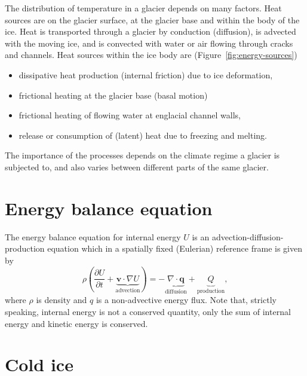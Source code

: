 \documentclass[parskip=half]{scrartcl}
\newcommand{\bq}{\mathbf{q}}
\newcommand{\bv}{\mathbf{v}}
\newcommand{\ddt}[1]{\ensuremath{\frac{\partial #1}{\partial t}}}
\newcommand{\Div}{\nabla\cdot}
\newcommand{\grad}{\nabla}
\begin{document}
The distribution of temperature in a glacier depends on many factors.
Heat sources are on the glacier surface, at the glacier base and
within the body of the ice.  Heat is transported through a glacier by
conduction (diffusion), is advected with the moving ice, and is
convected with water or air flowing through cracks and channels.  Heat
sources within the ice body are (Figure~\ref{fig:energy-sources})
%
\begin{itemize}\itemsep0ex
\item dissipative heat production (internal friction) due to ice
deformation,
\item frictional heating at the glacier base (basal motion)
\item frictional heating of flowing water at englacial channel walls,
\item release or consumption of (latent) heat due to freezing and
melting.
\end{itemize}
%
The importance of the processes depends on the climate regime a
glacier is subjected to, and also varies between different parts of
the same glacier.


\section{Energy balance equation}
\label{sec:energy-balance}

The energy balance equation for internal energy $U$ is an
advection-diffusion-production equation which in a spatially fixed
(Eulerian) reference frame is given by
\begin{equation}
  \label{eq:energy-balance} \rho \left(\ddt{U} + \underbrace{\bv \cdot
\grad U}_{\textrm{advection}}\right) = - \underbrace{\Div
\bq}_{\textrm{diffusion}} + \underbrace{Q}_{\textrm{production}},
\end{equation} where $\rho$ is density and $q$ is a non-advective
energy flux. Note that, strictly speaking, internal energy is not a
conserved quantity, only the sum of internal energy and kinetic energy is
conserved.
%

\section{Cold ice}
\end{document}
